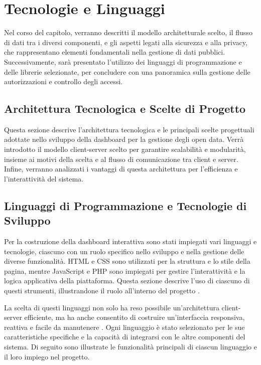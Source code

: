 \clearpage{\pagestyle{empty}\cleardoublepage}

\chapter{Tecnologie e Linguaggi}

Nel corso del capitolo, verranno descritti il modello architetturale scelto, il flusso di dati tra i diversi componenti, e gli aspetti legati alla sicurezza e alla privacy, che rappresentano elementi fondamentali nella gestione di dati pubblici. Successivamente, sarà presentato l’utilizzo dei linguaggi di programmazione e delle librerie selezionate, per concludere con una panoramica sulla gestione delle autorizzazioni e controllo degli accessi.

\section{Architettura Tecnologica e Scelte di Progetto}
Questa sezione descrive l'architettura tecnologica e le principali scelte progettuali adottate nello sviluppo della dashboard per la gestione degli open data. Verrà introdotto il modello client-server scelto per garantire scalabilità e modularità, insieme ai motivi della scelta e al flusso di comunicazione tra client e server. Infine, verranno analizzati i vantaggi di questa architettura per l'efficienza e l'interattività del sistema.

\section{Linguaggi di Programmazione e Tecnologie di Sviluppo}

Per la costruzione della dashboard interattiva sono stati impiegati vari linguaggi e tecnologie, ciascuno con un ruolo specifico nello sviluppo e nella gestione delle diverse funzionalità. HTML e CSS sono utilizzati per la struttura e lo stile della pagina, mentre JavaScript e PHP sono impiegati per gestire l'interattività e la logica applicativa della piattaforma. Questa sezione descrive l'uso di ciascuno di questi strumenti, illustrandone il ruolo all'interno del progetto \cite{flanagan2011javascript} \cite{esposito2020learning}.

La scelta di questi linguaggi non solo ha reso possibile un'architettura client-server efficiente, ma ha anche consentito di costruire un'interfaccia responsiva, reattiva e facile da manutenere \cite{mdn_docs}. Ogni linguaggio è stato selezionato per le sue caratteristiche specifiche e la capacità di integrarsi con le altre componenti del sistema. Di seguito sono illustrate le funzionalità principali di ciascun linguaggio e il loro impiego nel progetto.


